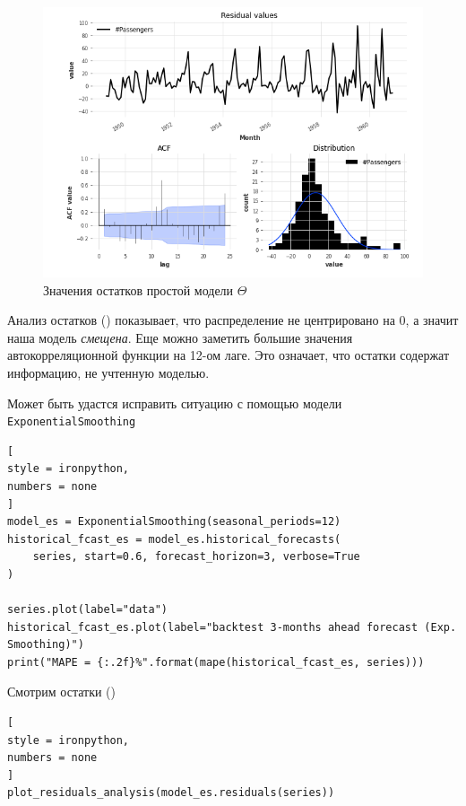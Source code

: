 \documentclass[%
	11pt,
	a4paper,
	utf8,
		]{article}
\begin{document}
\begin{figure}[h]
	\centering
	\includegraphics[scale=1.25]{figures/residuals_darts.png}
	\caption{ Значения остатков простой модели $ \Theta $}\label{fig:residuals_darts}
\end{figure}

Анализ остатков () показывает, что распределение не центрировано на 0, а значит наша модель \emph{смещена}. Еще можно заметить большие значения автокорреляционной функции на 12-ом лаге. Это означает, что остатки содержат информацию, не учтенную моделью.

Может быть удастся исправить ситуацию с помощью модели \verb|ExponentialSmoothing|
\begin{lstlisting}[
style = ironpython,
numbers = none
]
model_es = ExponentialSmoothing(seasonal_periods=12)
historical_fcast_es = model_es.historical_forecasts(
	series, start=0.6, forecast_horizon=3, verbose=True
)

series.plot(label="data")
historical_fcast_es.plot(label="backtest 3-months ahead forecast (Exp. Smoothing)")
print("MAPE = {:.2f}%".format(mape(historical_fcast_es, series)))
\end{lstlisting}

Смотрим остатки ()
\begin{lstlisting}[
style = ironpython,
numbers = none
]
plot_residuals_analysis(model_es.residuals(series))
\end{lstlisting}
\end{document}
